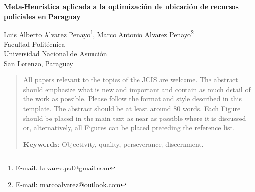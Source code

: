 \documentclass[format=acmsmall, screen=true, review=false]{acmart}
\begin{document}
\begin{center}

{\bf Meta-Heurística aplicada a la optimización de ubicación de recursos policiales en Paraguay}
\bigskip


{\small
Luis Alberto Alvarez Penayo\footnote{E-mail: lalvarez.pol@gmail.com}, Marco Antonio Alvarez Penayo\footnote{E-mail: marcoalvarez@outlook.com}\\
\smallskip
Facultad Politécnica\\
Universidad Nacional de Asunción\\
San Lorenzo, Paraguay
}
\end{center}



\begin{abstract}
All papers relevant to the topics of the JCIS are welcome. The abstract should emphasize what is new and important and contain as much detail of the work as possible. Please follow the format and style described in this template.  The abstract should be at least around 80 words.
Each Figure should be placed in the main text as near  as possible where it is discussed or, alternatively, all Figures can be placed preceding the reference list.

\bigskip

{\footnotesize
{\bf Keywords}: Objectivity, quality, perseverance, discernment.}
\end{abstract}
\end{document}
